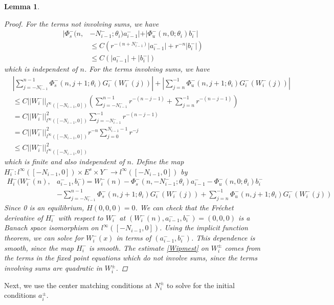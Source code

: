 \documentclass[12pt]{article}
\newtheorem{lemma}{Lemma}
\begin{document}
\begin{lemma}
\begin{proof}
For the terms not involving sums, we have
\begin{align*}
|\Phi_s^-(n, &-N_{i-1}^-; \theta_i) a_{i-1}^-| + |\Phi_u^-(n, 0; \theta_i) b_i^-| \\
&\leq C ( r^{-(n + N_{i-1}^-)} |a_{i-1}^-| +  r^{-n}|b_i^-|) \\
&\leq C ( |a_{i-1}^-| + |b_i^-|) 
\end{align*}
which is independent of $n$. For the terms involving sums, we have
\begin{align*}
&\left| \sum_{j = -N_{i-1}^-}^{n-1} \Phi_s^-(n, j+1; \theta_i) G_i^-(W_i^-(j))\right| + \left|\sum_{j = n}^{-1} \Phi_u^-(n, j+1; \theta_i) G_i^-(W_i^-(j))\right| \\
&\leq C ||W_i^-||_{l^\infty([-N_{i-1}, 0])} \left( \sum_{j = -N_{i-1}^-}^{n-1} r^{-(n - j - 1)} + \sum_{j = n}^{-1} r^{-(n - j - 1)} \right) \\
&= C ||W_i^-||_{l^\infty([-N_{i-1}, 0])}^2 \sum_{j = -N_{i-1}^-}^{-1} r^{-(n - j - 1)} \\
&= C ||W_i^-||_{l^\infty([-N_{i-1}, 0])}^2 r^{-n} \sum_{j = 0}^{N_{i-1} - 1} r^{-j} \\
&\leq C ||W_i^-||_{l^\infty([-N_{i-1}, 0])}^2 
\end{align*}
which is finite and also independent of $n$. Define the map $H_i^-: l^\infty([-N_{i-1}, 0]) \times E^s \times Y^- \rightarrow l^\infty([-N_{i-1}, 0])$ by
\begin{align*}
H_i^-(W_i^-(n), &a_{i-1}^-, b_i^-) = W_i^-(n) - \Phi_s^-(n, -N_{i-1}^-; \theta_i) a_{i-1}^- - \Phi_u^-(n, 0; \theta_i) b_i^-  \\
&- \sum_{j = -N_{i-1}^-}^{n-1} \Phi_s^-(n, j+1; \theta_i) G_i^-(W_i^-(j)) + \sum_{j = n}^{-1} \Phi_u^-(n, j+1; \theta_i) G_i^-(W_i^-(j)) 
\end{align*}
Since 0 is an equilibrium, $H(0, 0, 0) = 0$. We can check that the Fr\'echet derivative of $H_i^-$ with respect to $W_i^-$ at $(W_i^-(n), a_{i-1}^-, b_i^-) = (0, 0, 0)$ is a Banach space isomorphism on $l^\infty([-N_{i-1}, 0])$. Using the implicit function theorem, we can solve for $W_i^-(x)$ in terms of $(a_{i-1}^-, b_i^-)$. This dependence is smooth, since the map $H_i^-$ is smooth. The estimate \eqref{Wipmest} on $W_i^\pm$ comes from the terms in the fixed point equations which do not involve sums, since the terms involving sums are quadratic in $W_i^\pm$. 
\end{proof}
\end{lemma}

Next, we use the center matching conditions at $N_i^\pm$ to solve for the initial conditions $a_i^\pm$.
\end{document}
